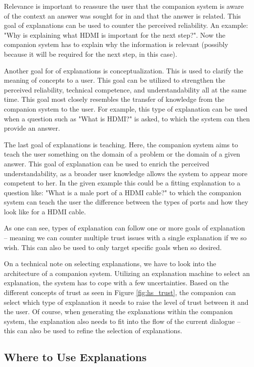 \documentclass[a4paper]{article}
\begin{document}
Relevance is important to reassure the user that the companion system is aware of the context an answer was sought for in and that the answer is related. This goal of explanations can be used to counter the perceived reliability. An example: "Why is explaining what HDMI is important for the next step?". Now the companion system has to explain why the information is relevant (possibly because it will be required for the next step, in this case).

Another goal for of explanations is conceptualization. This is used to clarify the meaning of concepts to a user. This goal can be utilized to strengthen the perceived reliability, technical competence, and understandability all at the same time. This goal most closely resembles the transfer of knowledge from the companion system to the user. For example, this type of explanation can be used when a question such as "What is HDMI?" is asked, to which the system can then provide an answer.

The last goal of explanations is teaching. Here, the companion system aims to teach the user something on the domain of a problem or the domain of a given answer. This goal of explanation can be used to enrich the perceived understandability, as a broader user knowledge allows the system to appear more competent to her. In the given example this could be a fitting explanation to a question like: "What is a male port of a HDMI cable?" to which the companion system can teach the user the difference between the types of ports and how they look like for a HDMI cable.

As one can see, types of explanation can follow one or more goals of explanation – meaning we can counter multiple trust issues with a single explanation if we so wish. This can also be used to only target specific goals when so desired.

On a technical note on selecting explanations, we have to look into the architecture of a companion system. Utilizing an explanation machine to select an explanation, the system has to cope with a few uncertainties. Based on the different concepts of trust as seen in Figure \ref{fig:hs_trust}, the companion can select which type of explanation it needs to raise the level of trust between it and the user. Of course, when generating the explanations within the companion system, the explanation also needs to fit into the flow of the current dialogue – this can also be used to refine the selection of explanations.

\subsection{Where to Use Explanations}
\label{know_graph}
\end{document}
